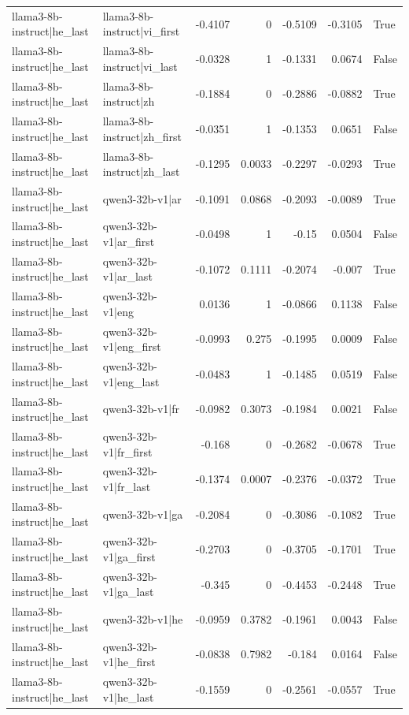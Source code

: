 \begin{table}
\begin{tabular}{l l r r r r l}
llama3-8b-instruct|he_last & llama3-8b-instruct|vi_first & -0.4107 & 0 & -0.5109 & -0.3105 & True \\
llama3-8b-instruct|he_last & llama3-8b-instruct|vi_last & -0.0328 & 1 & -0.1331 & 0.0674 & False \\
llama3-8b-instruct|he_last & llama3-8b-instruct|zh & -0.1884 & 0 & -0.2886 & -0.0882 & True \\
llama3-8b-instruct|he_last & llama3-8b-instruct|zh_first & -0.0351 & 1 & -0.1353 & 0.0651 & False \\
llama3-8b-instruct|he_last & llama3-8b-instruct|zh_last & -0.1295 & 0.0033 & -0.2297 & -0.0293 & True \\
llama3-8b-instruct|he_last & qwen3-32b-v1|ar & -0.1091 & 0.0868 & -0.2093 & -0.0089 & True \\
llama3-8b-instruct|he_last & qwen3-32b-v1|ar_first & -0.0498 & 1 & -0.15 & 0.0504 & False \\
llama3-8b-instruct|he_last & qwen3-32b-v1|ar_last & -0.1072 & 0.1111 & -0.2074 & -0.007 & True \\
llama3-8b-instruct|he_last & qwen3-32b-v1|eng & 0.0136 & 1 & -0.0866 & 0.1138 & False \\
llama3-8b-instruct|he_last & qwen3-32b-v1|eng_first & -0.0993 & 0.275 & -0.1995 & 0.0009 & False \\
llama3-8b-instruct|he_last & qwen3-32b-v1|eng_last & -0.0483 & 1 & -0.1485 & 0.0519 & False \\
llama3-8b-instruct|he_last & qwen3-32b-v1|fr & -0.0982 & 0.3073 & -0.1984 & 0.0021 & False \\
llama3-8b-instruct|he_last & qwen3-32b-v1|fr_first & -0.168 & 0 & -0.2682 & -0.0678 & True \\
llama3-8b-instruct|he_last & qwen3-32b-v1|fr_last & -0.1374 & 0.0007 & -0.2376 & -0.0372 & True \\
llama3-8b-instruct|he_last & qwen3-32b-v1|ga & -0.2084 & 0 & -0.3086 & -0.1082 & True \\
llama3-8b-instruct|he_last & qwen3-32b-v1|ga_first & -0.2703 & 0 & -0.3705 & -0.1701 & True \\
llama3-8b-instruct|he_last & qwen3-32b-v1|ga_last & -0.345 & 0 & -0.4453 & -0.2448 & True \\
llama3-8b-instruct|he_last & qwen3-32b-v1|he & -0.0959 & 0.3782 & -0.1961 & 0.0043 & False \\
llama3-8b-instruct|he_last & qwen3-32b-v1|he_first & -0.0838 & 0.7982 & -0.184 & 0.0164 & False \\
llama3-8b-instruct|he_last & qwen3-32b-v1|he_last & -0.1559 & 0 & -0.2561 & -0.0557 & True \\

\end{tabular}
\end{table}
